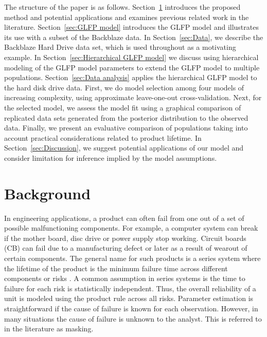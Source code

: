 \documentclass[aap]{imsart}
\begin{document}
The structure of the paper is as follows. Section~\ref{sec:Background} introduces the proposed method and potential applications and examines previous related work in the literature.  Section~\ref{sec:GLFP model} introduces the GLFP model and illustrates its use with a subset of the Backblaze data.  In Section~\ref{sec:Data}, we describe the Backblaze Hard Drive data set, which is used throughout as a motivating example. In Section~\ref{sec:Hierarchical GLFP model} we discuss using hierarchical modeling of the GLFP model parameters to extend the GLFP model to multiple populations. Section~\ref{sec:Data analysis} applies the hierarchical GLFP model to the hard disk drive data. First, we do model selection among four models of increasing complexity, using approximate leave-one-out cross-validation. Next, for the selected model, we assess the model fit using a graphical comparison of replicated data sets generated from the posterior distribution to the observed data. Finally, we present an evaluative comparison of populations taking into account practical considerations related to product lifetime. In Section~\ref{sec:Discussion}, we suggest potential applications of our model and consider limitation for inference implied by the model assumptions.

\section{Background}
\label{sec:Background}
In engineering applications, a product can often fail from one out of a set of possible malfunctioning components.  For example, a computer system can break if the mother board, disc drive or power supply stop working.  Circuit boards (CB) can fail due to a manufacturing defect or later as a result of wearout of certain components.  The general name for such products is a series system where the lifetime of the product is the minimum failure time across different components or risks \citep[Chapter 5]{nelson}.  A common assumption in series systems is the time to failure for each risk is statistically independent.  Thus, the overall reliability of a unit is modeled using the product rule across all risks.  Parameter estimation is straightforward if the cause of failure is known for each observation.  However, in many situations the cause of failure is unknown to the analyst. This is referred to in the literature as masking.\\
\end{document}
